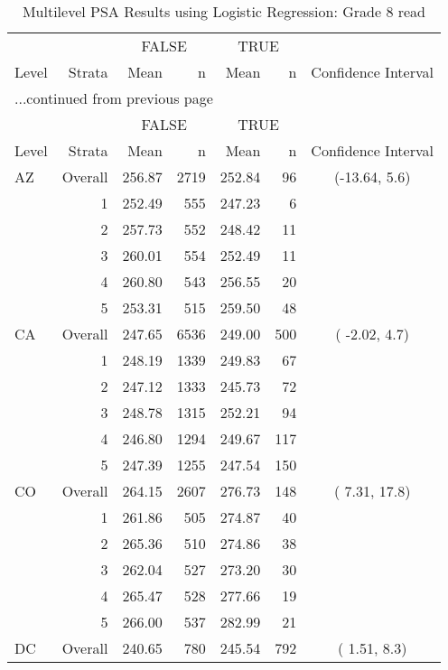 \begin{longtable}{lrrr@{\extracolsep{.25cm}}rrc}
\caption{Multilevel PSA Results using Logistic Regression: Grade 8 read} \\ 
   \hline & & \multicolumn{2}{c}{FALSE} & \multicolumn{2}{c}{TRUE} & \\ \cline{3-4} \cline{5-6} Level & Strata & Mean & n & Mean & n & Confidence Interval \\ \hline\endfirsthead \multicolumn{7}{l}{{...continued from previous page}}\\ \hline  & & \multicolumn{2}{c}{FALSE} & \multicolumn{2}{c}{TRUE} & \\ \cline{3-4} \cline{5-6} Level & Strata & Mean & n & Mean & n & Confidence Interval \\ \hline \endhead \endfoot \endlastfoot  \hline
AZ & Overall & 256.87 & 2719 & 252.84 &  96 & (-13.64,   5.6) \\ 
   & 1 & 252.49 & 555 & 247.23 &   6 &  \\ 
   & 2 & 257.73 & 552 & 248.42 &  11 &  \\ 
   & 3 & 260.01 & 554 & 252.49 &  11 &  \\ 
   & 4 & 260.80 & 543 & 256.55 &  20 &  \\ 
   & 5 & 253.31 & 515 & 259.50 &  48 &  \\ 
   \hline
CA & Overall & 247.65 & 6536 & 249.00 & 500 & ( -2.02,   4.7) \\ 
   & 1 & 248.19 & 1339 & 249.83 &  67 &  \\ 
   & 2 & 247.12 & 1333 & 245.73 &  72 &  \\ 
   & 3 & 248.78 & 1315 & 252.21 &  94 &  \\ 
   & 4 & 246.80 & 1294 & 249.67 & 117 &  \\ 
   & 5 & 247.39 & 1255 & 247.54 & 150 &  \\ 
   \hline
CO & Overall & 264.15 & 2607 & 276.73 & 148 & (  7.31,  17.8) \\ 
   & 1 & 261.86 & 505 & 274.87 &  40 &  \\ 
   & 2 & 265.36 & 510 & 274.86 &  38 &  \\ 
   & 3 & 262.04 & 527 & 273.20 &  30 &  \\ 
   & 4 & 265.47 & 528 & 277.66 &  19 &  \\ 
   & 5 & 266.00 & 537 & 282.99 &  21 &  \\ 
   \hline
DC & Overall & 240.65 & 780 & 245.54 & 792 & (  1.51,   8.3) \\ 

\end{longtable}
